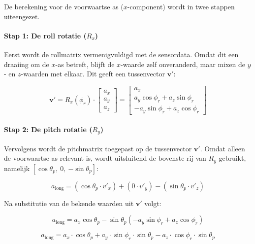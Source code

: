 De berekening voor de voorwaartse as ($x$-component) wordt in twee 
stappen uiteengezet.

\paragraph{Stap 1: De roll rotatie ($R_x$)}

Eerst wordt de rollmatrix vermenigvuldigd met de sensordata. Omdat dit 
een draaiing om de $x$-as betreft, blijft de $x$-waarde zelf 
onveranderd, maar mixen de $y$- en $z$-waarden met elkaar. Dit geeft 
een tussenvector $\mathbf{v}'$:

\begin{equation}
    \mathbf{v}' = R_x(\phi_r) \cdot \begin{bmatrix} a_x \\ a_y \\ a_z 
    \end{bmatrix} = \begin{bmatrix} a_x \\ a_y \cos\phi_r + a_z 
    \sin\phi_r \\ -a_y \sin\phi_r + a_z \cos\phi_r \end{bmatrix}
    \label{eq:roll_matrix_bijlage}
\end{equation}

\paragraph{Stap 2: De pitch rotatie ($R_y$)}

Vervolgens wordt de pitchmatrix toegepast op de tussenvector 
$\mathbf{v}'$. Omdat alleen de voorwaartse as relevant is, wordt 
uitsluitend de bovenste rij van $R_y$ gebruikt, namelijk 
$[\cos\theta_p,\ 0,\ {-\sin\theta_p}]$:

\begin{equation}
    a_{\text{long}} = (\cos\theta_p \cdot v'_x) + (0 \cdot v'_y) - 
    (\sin\theta_p \cdot v'_z)
    \label{eq:pitch_matrix_bijlage}
\end{equation}

Na substitutie van de bekende waarden uit $\mathbf{v}'$ volgt:

\begin{equation}
    a_{\text{long}} = a_x \cos\theta_p - \sin\theta_p 
    (-a_y \sin\phi_r + a_z \cos\phi_r)
\end{equation}

\begin{equation}
    a_{\text{long}} = a_x \cdot \cos\theta_p + a_y \cdot \sin\phi_r 
    \cdot \sin\theta_p - a_z \cdot \cos\phi_r \cdot \sin\theta_p
    \label{eq:accel_correctie_bijlage}
\end{equation}

